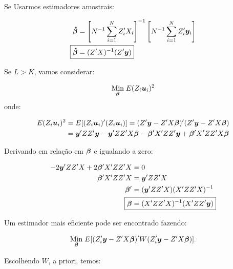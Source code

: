 \documentclass[11pt,oneside,a4paper]{article}
\numberwithin{equation}{section}
\begin{document}
Se Usarmos estimadores amostrais:

\vspace{-1 em}
\begin{align*}
\mbs{\hat{\beta}} &=
\left[ N^{-1} \sum_{i=1}^{N} Z_{i}^{\prime} X_{i} \right]^{-1}
\left[ N^{-1} \sum_{i=1}^{N} Z_{i}^{\prime} \mbs{y}_{i} \right]
\\
\Aboxed{
\mbs{\hat{\beta}} &=
( Z^{\prime} X )^{-1} ( Z^{\prime} \mbs{y} ) }
\end{align*}

\vspace{1 em}
Se $L > K$, vamos considerar:

\vspace{-1 em}
\begin{align*}
\underset{\boldsymbol{\beta}}{\text{Min}} \;
E( Z_{i}\boldsymbol{u}_{i} )^2
\end{align*}
\noindent onde:

\vspace{-1 em}
\begin{align*}
E( Z_{i}\boldsymbol{u}_{i} )^2 
&=
E[ ( Z_{i}\boldsymbol{u}_{i} )' ( Z_{i}\boldsymbol{u}_{i} ) ]
=
( Z' \boldsymbol{y} - Z' X \boldsymbol{\beta} )' ( Z' \boldsymbol{y} - Z' X \boldsymbol{\beta} )
\\
&=
\boldsymbol{y}' ZZ' \boldsymbol{y}
-
\boldsymbol{y}' ZZ' X \boldsymbol{\beta}
-
\boldsymbol{\beta}' X' ZZ' \boldsymbol{y}
+
\boldsymbol{\beta}' X' ZZ' X \boldsymbol{\beta}
\end{align*}

Derivando em relação em $\boldsymbol{\beta}$ e igualando a zero:

\vspace{-1 em}
\begin{align*}
-2 \mbs{y}' ZZ' X + 2 \mbs{\beta}'X' ZZ' X &= 0
\\
\mbs{\beta}'X' ZZ' X &= \mbs{y}' ZZ' X 
\\
\mbs{\beta}' &= ( \mbs{y}' ZZ' X ) ( X' ZZ' X )^{-1}
\\
\Aboxed{
\mbs{\beta} &= ( X' ZZ' X )^{-1} ( X' ZZ' \mbs{y} ) }
\end{align*}

Um estimador mais eficiente pode ser encontrado fazendo:

\vspace{-1 em}
\begin{align*}
\underset{\boldsymbol{\beta}}{\text{Min}} \;
E[ ( Z_{i}' \boldsymbol{y} - Z' X \boldsymbol{\beta} )' W ( Z_{i}' \boldsymbol{y} - Z' X \boldsymbol{\beta} ) ].
\end{align*}

\noindent
Escolhendo $\widehat{W}$, a priori, temos:
\end{document}
